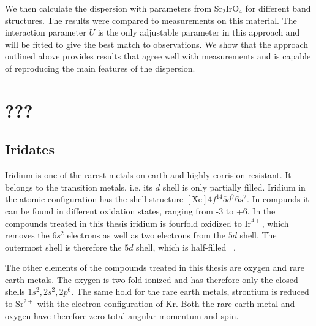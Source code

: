 \documentclass[a4paper,12pt]{report}
\begin{document}
We then calculate the dispersion with parameters from Sr$_2$IrO$_4$ for different band structures.
The results were compared to measurements on this material. 
The interaction parameter $U$ is the only adjustable parameter in this approach and will be fitted to give the best match to observations.
We show that the approach outlined above provides results that agree well with measurements and is capable of reproducing the main features of the dispersion.
%


  

\chapter{???}

\section{Iridates}
Iridium is one of the rarest metals on earth and highly corrision-resistant. 
It belongs to the transition metals, i.e. its $d$ shell is only partially filled.  
Iridium in the atomic configuration has the shell structure $[\mathrm{Xe}]4f^{14}5d^7 6s^2$.
In compunds it can be found in different oxidation states, ranging from -3 to +6.
In the compounds treated in this thesis iridium is fourfold oxidized to $\mathrm{Ir}^{4+}$, 
which removes the $6s^2$ electrons as well as two electrons from the $5d$ shell.
The outermost shell is therefore the $5d$ shell, which is half-filled ~\cite{Abragam70}.



The other elements of the compounds treated in this thesis are oxygen and rare earth metals. 
The oxygen is two fold ionized and has therefore only the closed shells $1s^2,2s^2,2p^6$.
The same hold for the rare earth metals, strontium is reduced to 
$\mathrm{Sr}^{2+}$ with the electron configuration of $\mathrm{Kr}$. 
Both the rare earth metal and oxygen have therefore zero total angular momentum and spin. 
\end{document}
